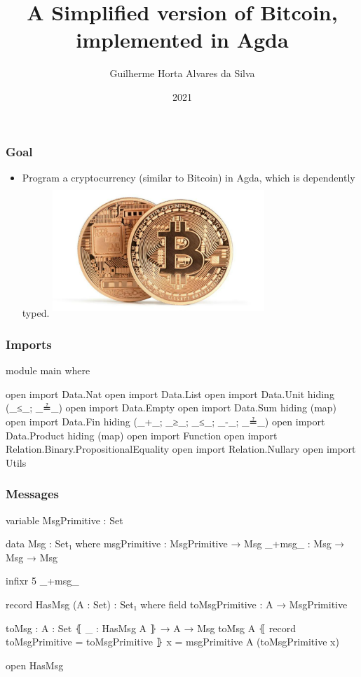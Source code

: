 \documentclass{beamer}
\title{A Simplified version of Bitcoin, \\
    implemented in Agda}
\author[Guilherme]{Guilherme Horta Alvares da Silva}
\date{2021}
\begin{document}
\frame{\titlepage}

\begin{frame}
\frametitle{Goal}
\begin{itemize}
  \item Program a cryptocurrency (similar to Bitcoin) in Agda, which is dependently typed.
    \includegraphics[width=8cm, height=5cm]{TwoBitcoins}
\end{itemize}
\end{frame}

\begin{frame}
  \frametitle{Imports}
\begin{code}

module main where

open import Data.Nat
open import Data.List
open import Data.Unit hiding (_≤_; _≟_)
open import Data.Empty
open import Data.Sum hiding (map)
open import Data.Fin hiding (_+_; _≥_; _≤_; _-_; _≟_)
open import Data.Product hiding (map)
open import Function
open import Relation.Binary.PropositionalEquality
open import Relation.Nullary
open import Utils

\end{code}
\end{frame}

\begin{frame}
  \frametitle{Messages}
\begin{code}

variable
  MsgPrimitive : Set

data Msg : Set₁ where
  msgPrimitive : MsgPrimitive → Msg
  _+msg_ : Msg → Msg → Msg

infixr 5 _+msg_

record HasMsg (A : Set) : Set₁ where
  field
    toMsgPrimitive : A → MsgPrimitive

toMsg : {A : Set} ⦃ _ : HasMsg A ⦄ → A → Msg
toMsg {A} ⦃ record { toMsgPrimitive = toMsgPrimitive } ⦄ x
  = msgPrimitive {A} (toMsgPrimitive x)

open HasMsg

\end{code}
\end{frame}
\end{document}
